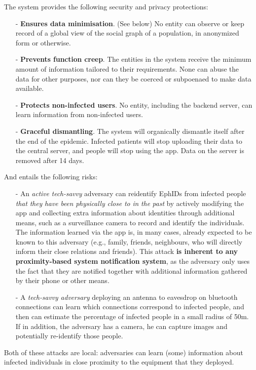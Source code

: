 \documentclass[12pt,a4paper]{article}
\begin{document}
The system provides the following security and privacy protections:
\begin{itemize}\itemsep0pt
\item[-] \textbf{Ensures data minimisation}. (See below) No entity can observe or keep record of a global view of the social graph of a population, in anonymized form or otherwise.
\item[-] \textbf{Prevents function creep}. The entities in the system receive the minimum amount of information tailored to their requirements. None can abuse the data for other
purposes, nor can they be coerced or subpoenaed to make data available.
\item[-] \textbf{Protects non-infected users}. No entity, including the backend server, can learn information from non-infected users.
\item[-] \textbf{Graceful dismantling}. The system will organically dismantle itself after the end of the epidemic. Infected patients will stop uploading their data to the central server, and people will stop using the app. Data on the server is removed after 14 days.
\end{itemize}
And entails the following risks:
\begin{itemize}\itemsep0pt
\item[-] An \textit{active tech-savvy} adversary can reidentify EphIDs from infected people \textit{that they have been physically close to in the past} by actively modifying the app and collecting extra information about identities through additional means, such as a surveillance camera to record and identify the individuals. The information learned via the app is, in many cases, already expected to be known to this adversary (e.g., family, friends, neighbours, who will directly inform their close relations and friends). This attack \textbf{is inherent to any proximity-based system notification system}, as the adversary only uses the fact that they are notified together with additional information gathered by their phone or other means.
\item[-] A \textit{tech-savvy adversary} deploying an antenna to eavesdrop on bluetooth connections can learn which connections correspond to infected people, and then can estimate the percentage of infected people in a small radius of 50m. If in addition, the
adversary has a camera, he can capture images and potentially re-identify those people.
\end{itemize}
Both of these attacks are local: adversaries can learn (some) information about infected
individuals in close proximity to the equipment that they deployed.
\end{document}

